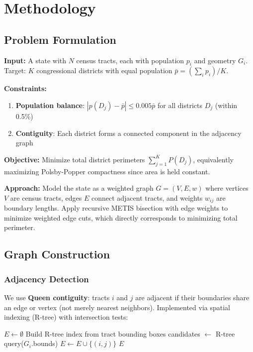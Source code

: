 \section{Methodology}

\subsection{Problem Formulation}

\textbf{Input:} A state with $N$ census tracts, each with population $p_i$ and geometry $G_i$. Target: $K$ congressional districts with equal population $\bar{p} = (\sum_i p_i) / K$.

\textbf{Constraints:}
\begin{enumerate}
    \item \textbf{Population balance}: $|p(D_j) - \bar{p}| \leq 0.005 \bar{p}$ for all districts $D_j$ (within 0.5\%)
    \item \textbf{Contiguity}: Each district forms a connected component in the adjacency graph
\end{enumerate}

\textbf{Objective:} Minimize total district perimeters $\sum_{j=1}^{K} P(D_j)$, equivalently maximizing Polsby-Popper compactness since area is held constant.

\textbf{Approach:} Model the state as a weighted graph $G = (V, E, w)$ where vertices $V$ are census tracts, edges $E$ connect adjacent tracts, and weights $w_{ij}$ are boundary lengths. Apply recursive METIS bisection with edge weights to minimize weighted edge cuts, which directly corresponds to minimizing total perimeter.

\subsection{Graph Construction}

\subsubsection{Adjacency Detection}

We use \textbf{Queen contiguity}: tracts $i$ and $j$ are adjacent if their boundaries share an edge or vertex (not merely nearest neighbors). Implemented via spatial indexing (R-tree) with intersection tests:

\begin{algorithmic}[1]
    \State $E \gets \emptyset$
    \State Build R-tree index from tract bounding boxes
        \State candidates $\gets$ R-tree query($G_i$.bounds)
                \State $E \gets E \cup \{(i, j)\}$
            \EndIf
        \EndFor
    \EndFor
    \State \Return $E$
\EndFunction
\end{algorithmic}

